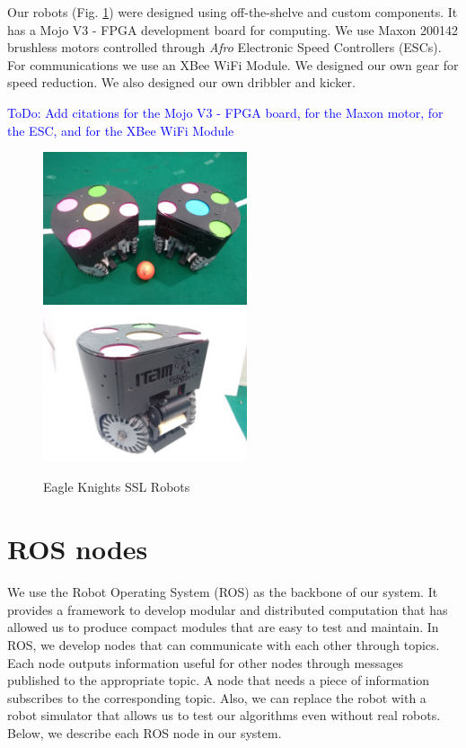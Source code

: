 \documentclass[]{llncs}
\newcommand{\TODO}[1]{{\textcolor{blue}{ToDo: {#1}}}}
\begin{document}
Our robots (Fig. \ref{fig:two-ekbots}) were designed using
off-the-shelve and custom components. It has a Mojo V3 - FPGA development board for computing. We use Maxon 200142 brushless motors controlled through \emph{Afro} Electronic Speed Controllers (ESCs). For communications we use an XBee WiFi Module. We designed our own gear for speed reduction. We also designed our own dribbler and kicker. 

\TODO{Add citations for the Mojo V3 - FPGA board, for the Maxon motor, for the ESC, and for the XBee WiFi Module}

\begin{figure}[htb]
	\centering
	\includegraphics[width=6cm]{./pictures/two_ekbots.jpg}
	\includegraphics[width=6cm]{./pictures/ekbot_front.jpg}
	\caption{Eagle Knights SSL Robots}
	\label{fig:two-ekbots}  
\end{figure}


\section{ROS nodes}

We use the Robot Operating System (ROS) as the backbone of our system. It provides a framework to develop modular and distributed computation that has allowed us to produce compact modules that are easy to test and maintain. In ROS, we develop nodes that can communicate with each other through topics. Each node outputs information useful for other nodes through messages published to the appropriate topic. A node that needs a piece of information subscribes to the corresponding topic. Also, we can replace the robot with a robot simulator that allows us to test our algorithms even without real robots. Below, we describe each ROS node in our system.
\end{document}
